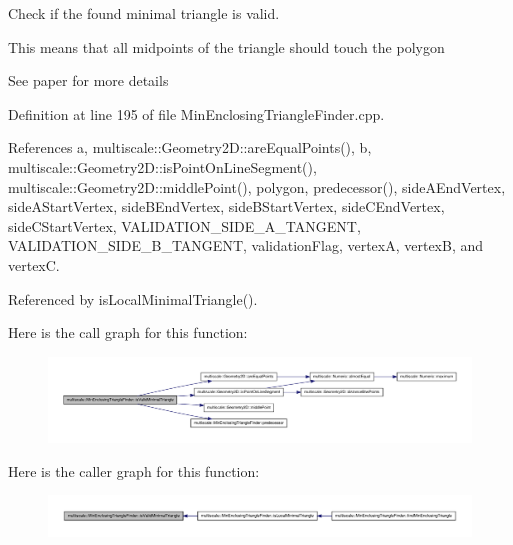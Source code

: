 \-Check if the found minimal triangle is valid. 

\-This means that all midpoints of the triangle should touch the polygon

\-See paper for more details 

\-Definition at line 195 of file \-Min\-Enclosing\-Triangle\-Finder.\-cpp.



\-References a, multiscale\-::\-Geometry2\-D\-::are\-Equal\-Points(), b, multiscale\-::\-Geometry2\-D\-::is\-Point\-On\-Line\-Segment(), multiscale\-::\-Geometry2\-D\-::middle\-Point(), polygon, predecessor(), side\-A\-End\-Vertex, side\-A\-Start\-Vertex, side\-B\-End\-Vertex, side\-B\-Start\-Vertex, side\-C\-End\-Vertex, side\-C\-Start\-Vertex, \-V\-A\-L\-I\-D\-A\-T\-I\-O\-N\-\_\-\-S\-I\-D\-E\-\_\-\-A\-\_\-\-T\-A\-N\-G\-E\-N\-T, \-V\-A\-L\-I\-D\-A\-T\-I\-O\-N\-\_\-\-S\-I\-D\-E\-\_\-\-B\-\_\-\-T\-A\-N\-G\-E\-N\-T, validation\-Flag, vertex\-A, vertex\-B, and vertex\-C.



\-Referenced by is\-Local\-Minimal\-Triangle().



\-Here is the call graph for this function\-:\nopagebreak
\begin{figure}[H]
\begin{center}
\leavevmode
\includegraphics[width=350pt]{classmultiscale_1_1MinEnclosingTriangleFinder_a4f9c533c8d5de8b95c38b71f50a5e00c_cgraph}
\end{center}
\end{figure}




\-Here is the caller graph for this function\-:\nopagebreak
\begin{figure}[H]
\begin{center}
\leavevmode
\includegraphics[width=350pt]{classmultiscale_1_1MinEnclosingTriangleFinder_a4f9c533c8d5de8b95c38b71f50a5e00c_icgraph}
\end{center}
\end{figure}


